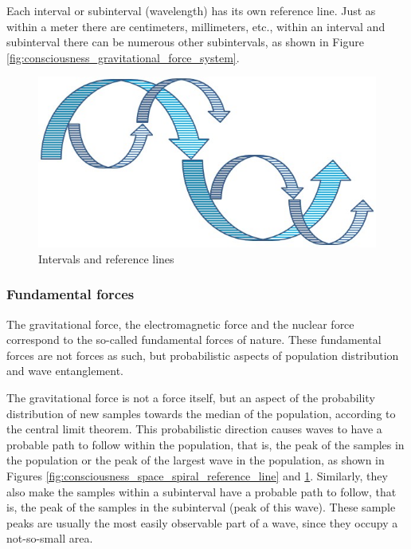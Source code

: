 Each interval or subinterval (wavelength) has its own reference line. Just as within a meter there are centimeters, millimeters, etc., within an interval and subinterval there can be numerous other subintervals, as shown in Figure \ref{fig:consciousness_gravitational_force_system}.
	\begin{figure}[H]
	\caption{Intervals and reference lines}
	\label{fig:consciousness_space_spiral_underlines}
	\centering
	\includegraphics[scale=.5]{sections/images/consciousness_space_spiral_underlines.jpg}
	\end{figure}

\subsubsection{Fundamental forces}
The gravitational force, the electromagnetic force and the nuclear force correspond to the so-called fundamental forces of nature. These fundamental forces are not forces as such, but probabilistic aspects of population distribution and wave entanglement.

The gravitational force is not a force itself, but an aspect of the probability distribution of new samples towards the median of the population, according to the central limit theorem.  This probabilistic direction causes waves to have a probable path to follow within the population, that is, the peak of the samples in the population or the peak of the largest wave in the population, as shown in Figures \ref{fig:consciousness_space_spiral_reference_line} and \ref{fig:consciousness_space_spiral_underlines}. Similarly, they also make the samples within a subinterval have a probable path to follow, that is, the peak of the samples in the subinterval (peak of this wave).  These sample peaks are usually the most easily observable part of a wave, since they occupy a not-so-small area.

